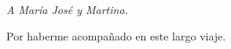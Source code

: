 
\begin{dedication} %

\textit{A María José y Martina.}

Por haberme acompañado en este largo viaje.

\end{dedication}

